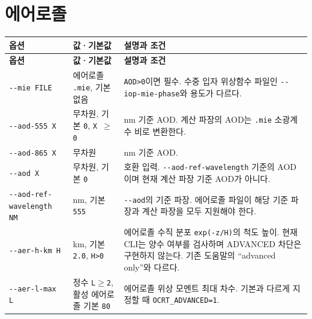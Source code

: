 \section{에어로졸}
\label{sec:auto:03_options:4}



{\TableFont
\begin{longtable}{@{}>{\raggedright\arraybackslash}p{}>{\raggedright\arraybackslash}p{}>{\raggedright\arraybackslash}p{}@{}}
\toprule
\textbf{옵션} & \textbf{값·기본값} & \textbf{설명과 조건} \\
\midrule
\endfirsthead
\toprule
\textbf{옵션} & \textbf{값·기본값} & \textbf{설명과 조건} \\
\midrule
\endhead
\bottomrule
\endfoot
\texttt{-\allowbreak{}-\allowbreak{}mie FILE} & 에어로졸 \texttt{.\allowbreak{}mie}, 기본 없음 & \texttt{AOD>0}이면 필수. 수중 입자 위상함수 파일인 \texttt{-\allowbreak{}-\allowbreak{}iop-\allowbreak{}mie-\allowbreak{}phase}와 용도가 다르다. \\
\texttt{-\allowbreak{}-\allowbreak{}aod-\allowbreak{}555 X} & 무차원, 기본 \texttt{0}, \texttt{X \ensuremath{\geq} 0} & 555 nm 기준 AOD. 계산 파장의 AOD는 \texttt{.\allowbreak{}mie} 소광계수 비로 변환한다. \\
\texttt{-\allowbreak{}-\allowbreak{}aod-\allowbreak{}865 X} & 무차원 & 865 nm 기준 AOD. \\
\texttt{-\allowbreak{}-\allowbreak{}aod X} & 무차원, 기본 \texttt{0} & 호환 입력. \texttt{-\allowbreak{}-\allowbreak{}aod-\allowbreak{}ref-\allowbreak{}wavelength} 기준의 AOD이며 현재 계산 파장 기준 AOD가 아니다. \\
\texttt{-\allowbreak{}-\allowbreak{}aod-\allowbreak{}ref-\allowbreak{}wavelength NM} & nm, 기본 \texttt{555} & \texttt{-\allowbreak{}-\allowbreak{}aod}의 기준 파장. 에어로졸 파일이 해당 기준 파장과 계산 파장을 모두 지원해야 한다. \\
\texttt{-\allowbreak{}-\allowbreak{}aer-\allowbreak{}h-\allowbreak{}km H} & km, 기본 \texttt{2.\allowbreak{}0}, \texttt{H>0} & 에어로졸 수직 분포 \texttt{exp(-\allowbreak{}z/\allowbreak{}H)}의 척도 높이. 현재 CLI는 양수 여부를 검사하며 ADVANCED 차단은 구현하지 않는다. 기존 도움말의 “advanced only”와 다르다. \\
\texttt{-\allowbreak{}-\allowbreak{}aer-\allowbreak{}l-\allowbreak{}max L} & 정수 \texttt{L\ensuremath{\geq}2}, 활성 에어로졸 기본 \texttt{80} & 에어로졸 위상 모멘트 최대 차수. 기본과 다르게 지정할 때 \texttt{OCRT\_\allowbreak{}ADVANCED=\allowbreak{}1}. \\
\end{longtable}
}

